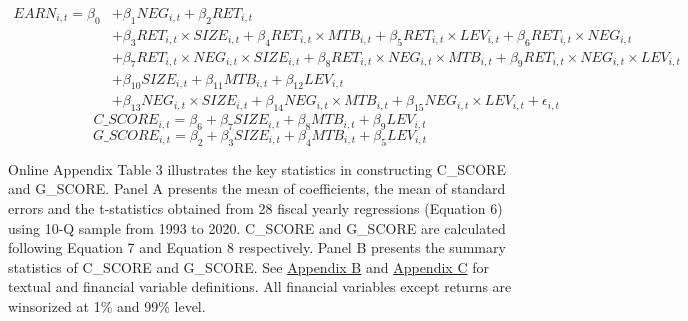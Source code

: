 \newpage

\setcounter{equation}{5}
\begin{equation}
\begin{split}
EARN_{i,t} = \beta_0&+\beta_1NEG_{i,t}+\beta_2RET_{i,t}\\
&+\beta_3RET_{i,t}\times SIZE_{i,t}+\beta_4RET_{i,t}\times MTB_{i,t}+\beta_5RET_{i,t}\times LEV_{i,t}+\beta_6RET_{i,t}\times NEG_{i,t}\\
&+\beta_7RET_{i,t}\times NEG_{i,t}\times SIZE_{i,t}+\beta_8RET_{i,t}\times NEG_{i,t}\times MTB_{i,t}+\beta_9RET_{i,t}\times NEG_{i,t}\times LEV_{i,t}\\
&+\beta_{10}SIZE_{i,t}+\beta_{11}MTB_{i,t}+\beta_{12}LEV_{i,t}\\
&+\beta_{13}NEG_{i,t}\times SIZE_{i,t}+\beta_{14}NEG_{i,t}\times MTB_{i,t}+\beta_{15}NEG_{i,t}\times LEV_{i,t}+ \epsilon_{i,t}
\end{split}
\end{equation}
\begin{equation}
C\_SCORE_{i,t} = \beta_6+\beta_7SIZE_{i,t}+\beta_8MTB_{i,t}+\beta_9LEV_{i,t}
\end{equation}
\begin{equation}
G\_SCORE_{i,t} = \beta_2+\beta_3SIZE_{i,t}+\beta_4MTB_{i,t}+\beta_5LEV_{i,t}
\end{equation}

Online Appendix Table 3 illustrates the key statistics in constructing C\_SCORE and G\_SCORE. Panel A presents the mean of coefficients, the mean of standard errors and the t-statistics obtained from 28 fiscal yearly regressions (Equation 6) using 10-Q sample from 1993 to 2020. C\_SCORE and G\_SCORE are calculated following Equation 7 and Equation 8 respectively. Panel B presents the summary statistics of C\_SCORE and G\_SCORE. See \hyperref[appb]{Appendix B} and \hyperref[appc]{Appendix C} for textual and financial variable definitions. All financial variables except returns are winsorized at 1\% and 99\% level.
